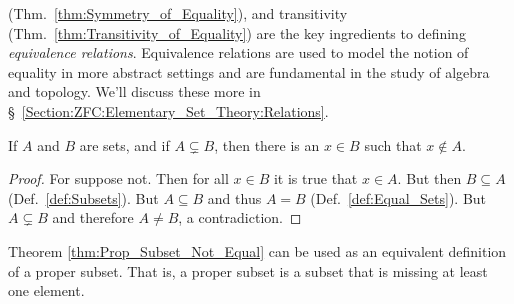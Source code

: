         (Thm.~\ref{thm:Symmetry_of_Equality}), and transitivity
        (Thm.~\ref{thm:Transitivity_of_Equality}) are the key ingredients to
        defining \textit{equivalence relations}.
        Equivalence relations are used to model the notion of equality in more
        abstract settings and are fundamental in the study of algebra and
        topology. We'll discuss these more in
        \S~\ref{Section:ZFC:Elementary_Set_Theory:Relations}.
        \begin{theorem}
            \label{thm:Prop_Subset_Not_Equal}%
            If $A$ and $B$ are sets, and if $A\subsetneq{B}$, then there is an
            $x\in{B}$ such that $x\notin{A}$.
        \end{theorem}
        \begin{proof}
            For suppose not. Then for all $x\in{B}$ it is true that $x\in{A}$.
            But then $B\subseteq{A}$ (Def.~\ref{def:Subsets}).
            But $A\subseteq{B}$ and thus $A=B$ (Def.~\ref{def:Equal_Sets}).
            But $A\subsetneq{B}$ and therefore $A\ne{B}$, a contradiction.
        \end{proof}
        Theorem \ref{thm:Prop_Subset_Not_Equal} can be used as an equivalent
        definition of a proper subset. That is, a proper subset is a subset that
        is missing at least one element.
